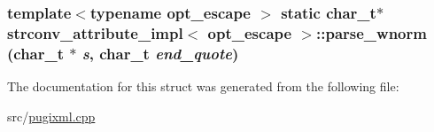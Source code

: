 \label{structstrconv__attribute__impl_a2d39998b79896af7c53c5f3dc22a526b}
\hypertarget{structstrconv__attribute__impl_a9b7f8b1e860c5d022dbd29f9a89e9e27}{
\subsubsection[{parse\_\-wnorm}]{\setlength{\rightskip}{0pt plus 5cm}template$<$typename opt\_\-escape $>$ static char\_\-t$\ast$ {\bf strconv\_\-attribute\_\-impl}$<$ opt\_\-escape $>$::parse\_\-wnorm (char\_\-t $\ast$ {\em s}, \/  char\_\-t {\em end\_\-quote})}}
\label{structstrconv__attribute__impl_a9b7f8b1e860c5d022dbd29f9a89e9e27}


The documentation for this struct was generated from the following file:\begin{DoxyCompactItemize}
\item 
src/\hyperlink{pugixml_8cpp}{pugixml.cpp}\end{DoxyCompactItemize}
